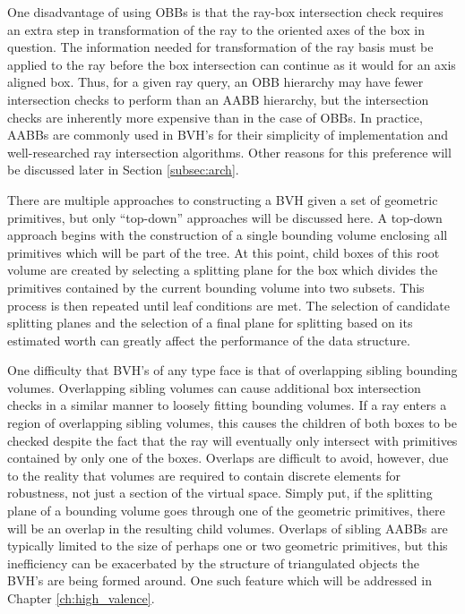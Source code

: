 One disadvantage of using OBBs is that the ray-box intersection check requires
an extra step in transformation of the ray to the oriented axes of the box in
question. The information needed for transformation of the ray basis must be
applied to the ray before the box intersection can continue as it would for an
axis aligned box. Thus, for a given ray query, an OBB hierarchy may have fewer
intersection checks to perform than an AABB hierarchy, but the intersection
checks are inherently more expensive than in the case of OBBs. In practice,
AABBs are commonly used in BVH's for their simplicity of implementation and
well-researched ray intersection algorithms. Other reasons for this preference
will be discussed later in Section \ref{subsec:arch}.

There are multiple approaches to constructing a BVH given a set
of geometric primitives, but only ``top-down'' approaches will be discussed
here. A top-down approach begins with the construction of a single bounding
volume enclosing all primitives which will be part of the tree. At this point,
child boxes of this root volume are created by selecting a splitting plane for
the box which divides the primitives contained by the current bounding volume
into two subsets. This process is then repeated until leaf conditions are
met. The selection of candidate splitting planes and the selection of a final
plane for splitting based on its estimated worth can greatly affect the
performance of the data structure.

One difficulty that BVH's of any type face is that of overlapping sibling
bounding volumes. Overlapping sibling volumes can cause additional box
intersection checks in a similar manner to loosely fitting bounding volumes. If
a ray enters a region of overlapping sibling volumes, this causes the children
of both boxes to be checked despite the fact that the ray will eventually only
intersect with primitives contained by only one of the boxes. Overlaps are
difficult to avoid, however, due to the reality that volumes are required to
contain discrete elements for robustness, not just a section of the virtual
space. Simply put, if the splitting plane of a bounding volume goes through one
of the geometric primitives, there will be an overlap in the resulting child
volumes. Overlaps of sibling AABBs are typically limited to the size of perhaps
one or two geometric primitives, but this inefficiency can be exacerbated by the
structure of triangulated objects the BVH's are being formed around. One such
feature which will be addressed in Chapter \ref{ch:high_valence}.

